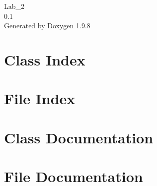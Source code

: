 \documentclass[twoside]{book}
\newcommand{\+}{\discretionary{\mbox{\scriptsize$\hookleftarrow$}}{}{}}
\newcommand{\clearemptydoublepage}{%
    \newpage{\pagestyle{empty}\cleardoublepage}%
  }
\begin{document}
  \raggedbottom
    \hypersetup{pageanchor=false,
                bookmarksnumbered=true,
                pdfencoding=unicode
               }
  \begin{titlepage}
  \vspace*{7cm}
  \begin{center}%
  {\Large Lab\+\_\+2}\\
  [1ex]\large 0.\+1 \\
  \vspace*{1cm}
  {\large Generated by Doxygen 1.9.8}\\
  \end{center}
  \end{titlepage}
  \clearemptydoublepage
  \tableofcontents
  \clearemptydoublepage
  \hypersetup{pageanchor=true}
\chapter{Class Index}

\chapter{File Index}

\chapter{Class Documentation}

\chapter{File Documentation}




  \backmatter
  \newpage
  \clearemptydoublepage
  \printindex
\end{document}
